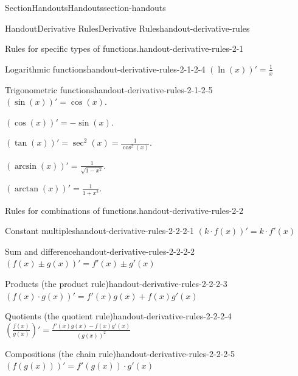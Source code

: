 \documentclass[twoside,10pt,]{article}
\numberwithin{equation}{section}
\begin{document}
\begin{sectionptx}{Section}{Handouts}{}{Handouts}{}{}{section-handouts}
\begin{handout-subsection}{Handout}{Derivative Rules}{}{Derivative Rules}{}{}{handout-derivative-rules}
\begin{paragraphs}{Rules for specific types of functions.}{handout-derivative-rules-2-1}
\begin{descriptionlist}
\begin{dlimedium}{Logarithmic functions}{handout-derivative-rules-2-1-2-4}
\(\displaystyle (\ln(x))' = \frac{1}{x}\)%
\end{dlimedium}%
\begin{dlimedium}{Trigonometric functions}{handout-derivative-rules-2-1-2-5}%
\((\sin(x))' = \cos(x)\).%
\par
\((\cos(x))' = -\sin(x)\).%
\par
\((\tan(x))' = \sec^{2}(x) = \frac{1}{\cos^{2}(x)}\).%
\par
\((\arcsin(x))' = \frac{1}{\sqrt{1-x^{2}}}\).%
\par
\((\arctan(x))' = \frac{1}{1+x^{2}}\).%
\end{dlimedium}%
\end{descriptionlist}
\end{paragraphs}%
\begin{paragraphs}{Rules for combinations of functions.}{handout-derivative-rules-2-2}%
%
\begin{descriptionlist}
\begin{dlimedium}{Constant multiples}{handout-derivative-rules-2-2-2-1}%
\(\displaystyle (k\cdot f(x))' = k\cdot f'(x)\)%
\end{dlimedium}%
\begin{dlimedium}{Sum and difference}{handout-derivative-rules-2-2-2-2}%
\(\displaystyle (f(x) \pm g(x))' = f'(x) \pm g'(x)\)%
\end{dlimedium}%
\begin{dlimedium}{Products (the product rule)}{handout-derivative-rules-2-2-2-3}%
\(\displaystyle (f(x)\cdot g(x))' = f'(x)g(x) + f(x)g'(x)\)%
\end{dlimedium}%
\begin{dlimedium}{Quotients (the quotient rule)}{handout-derivative-rules-2-2-2-4}%
\(\displaystyle \left(\frac{f(x)}{g(x)}\right)' = \frac{f'(x)g(x) - f(x)g'(x)}{(g(x))^{2}}\)%
\end{dlimedium}%
\begin{dlimedium}{Compositions (the chain rule)}{handout-derivative-rules-2-2-2-5}%
\(\displaystyle (f(g(x)))' = f'(g(x))\cdot g'(x)\)%
\end{dlimedium}%
\end{descriptionlist}
\end{paragraphs}%
\end{handout-subsection}
\restoregeometry
%
%
\typeout{************************************************}
\typeout{************************************************}
%

\end{sectionptx}
\end{document}
